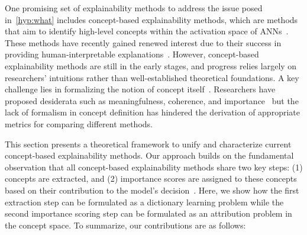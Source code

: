 One promising set of explainability methods to address the issue posed in~\autoref{hyp:what} includes concept-based explainability methods, which are methods that aim to identify high-level concepts within the activation space of ANNs~\cite{kim2018interpretability}. These methods have recently gained renewed interest due to their success in providing human-interpretable explanations~\cite{ghorbani2019towards, zhang2021invertible, fel2023craft, graziani2023concept}. However, concept-based explainability methods are still in the early stages, and progress relies largely on researchers' intuitions rather than well-established theoretical foundations.  A key challenge lies in formalizing the notion of concept itself~\cite{genone2012concept}. 
Researchers have proposed desiderata such as meaningfulness, coherence, and importance~\cite{ghorbani2019towards} but the lack of formalism in concept definition has hindered the derivation of appropriate metrics for comparing different methods.

This section presents a theoretical framework to unify and characterize current concept-based explainability methods. Our approach builds on the fundamental observation that all concept-based explainability methods share two key steps: (1) concepts are extracted, and (2) importance scores are assigned to these concepts based on their contribution to the model's decision~\cite{ghorbani2019towards}. Here, we show how the first extraction step can be formulated as a dictionary learning problem while the second importance scoring step can be formulated as an attribution problem in the concept space. To summarize, our contributions are as follows:


